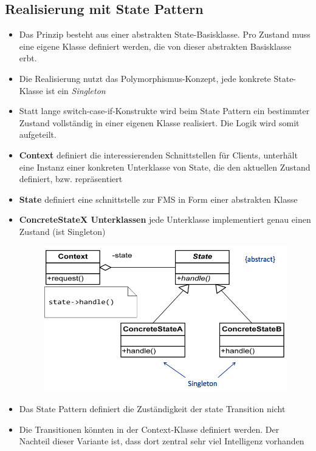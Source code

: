 \subsection{Realisierung mit State Pattern}
\begin{itemize}
  \item Das Prinzip besteht aus einer abstrakten State-Basisklasse. Pro Zustand
  muss eine eigene Klasse definiert werden, die von dieser abstrakten
  Basisklasse erbt.
  \item Die Realisierung nutzt das Polymorphismus-Konzept, jede konkrete
  State-Klasse ist ein \textit{Singleton}
  \item Statt lange switch-case-if-Konstrukte wird beim State Pattern ein
  bestimmter Zustand vollständig in einer eigenen Klasse realisiert. Die Logik
  wird somit aufgeteilt.
  \item \textbf{Context} definiert die interessierenden Schnittstellen für
  Clients, unterhält eine Instanz einer konkreten Unterklasse von State, die den
  aktuellen Zustand definiert, bzw. repräsentiert
  \item \textbf{State} definiert eine schnittstelle zur FMS in Form einer
  abstrakten Klasse
  \item \textbf{ConcreteStateX Unterklassen} jede Unterklasse implementiert
  genau einen Zustand (ist Singleton)
 \begin{figure}[h]
  \centering
  \includegraphics[scale = 0.3]{images/FSM/state_pattern}  
\end{figure}
\item Das State Pattern definiert die Zuständigkeit der state Transition nicht
\item Die Transitionen könnten in der Context-Klasse definiert werden. Der
Nachteil dieser Variante ist, dass dort zentral sehr viel Intelligenz vorhanden

\end{itemize}
